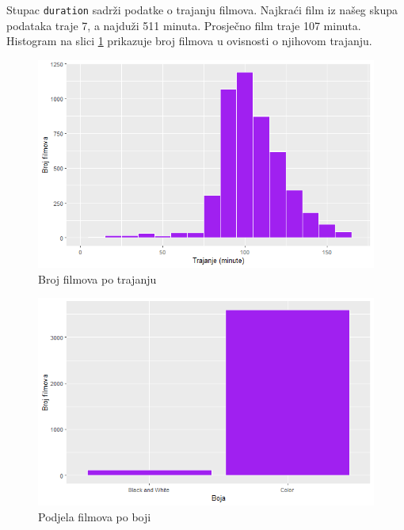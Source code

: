 	 Stupac \texttt{duration} sadrži podatke o trajanju filmova. Najkraći film iz našeg skupa podataka traje 7, a najduži 511 minuta. Prosječno film traje 107 minuta. Histogram na slici \ref{trajanje} prikazuje broj filmova u ovisnosti o njihovom trajanju. 
	 
	  \begin{figure}[H]
	 	\centering
	 	\includegraphics[width=15cm]{../figures/lucija_jednostavni/trajanje.png}
	 	\caption{Broj filmova po trajanju}
	 	\label{trajanje}
	 \end{figure}
	 
	 \begin{figure}[H]
	 	\centering
	 	\includegraphics[width=15cm]{../figures/lucija_jednostavni/boja.png}
	 	\caption{Podjela filmova po boji}
	 	\label{boja}
	 \end{figure}
	 
